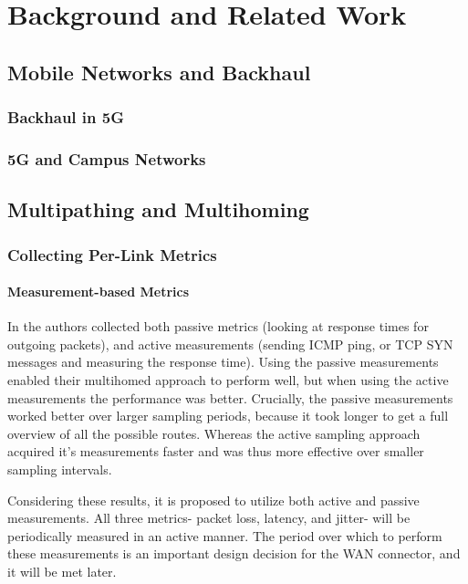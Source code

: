 
\cleardoublepage
\chapter{Background and Related Work}
\label{cha:background}

\section{Mobile Networks and Backhaul}

\subsection{Backhaul in 5G}

\subsection{5G and Campus Networks}


\section{Multipathing and Multihoming}

\subsection{Collecting Per-Link Metrics}

\subsubsection{Measurement-based Metrics}

In \cite{akella2008performance} the authors collected both passive metrics (looking at response times for outgoing packets), and active measurements (sending ICMP ping, or TCP SYN messages and measuring the response time). Using the passive measurements enabled their multihomed approach to perform well, but when using the active measurements the performance was better. Crucially, the passive measurements worked better over larger sampling periods, because it took longer to get a full overview of all the possible routes. Whereas the active sampling approach acquired it's measurements faster and was thus more effective over smaller sampling intervals.

Considering these results, it is proposed to utilize both active and passive measurements. All three metrics- packet loss, latency, and jitter- will be periodically measured in an active manner. The period over which to perform these measurements is an important design decision for the WAN connector, and it will be met later.

